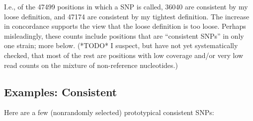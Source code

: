 \documentclass{article}\usepackage[]{graphicx}\usepackage[]{color}
\begin{document}
\noindent I.e., of the 47499 positions in which a SNP is called, 36040 are
consistent by my loose definition, and 47174 are consistent by my tightest definition.  The
increase in concordance supports the view that the loose definition is too loose.  Perhaps misleadingly, these counts
include positions that are ``consistent SNPs'' in only one strain; more below.  (*TODO* I suspect, but have not yet
systematically checked, that most of the rest are positions with low coverage and/or very low read counts on the mixture
of non-reference nucleotides.)

\subsection{Examples: Consistent}
Here are a few (nonrandomly selected) prototypical consistent SNPs:
\end{document}
